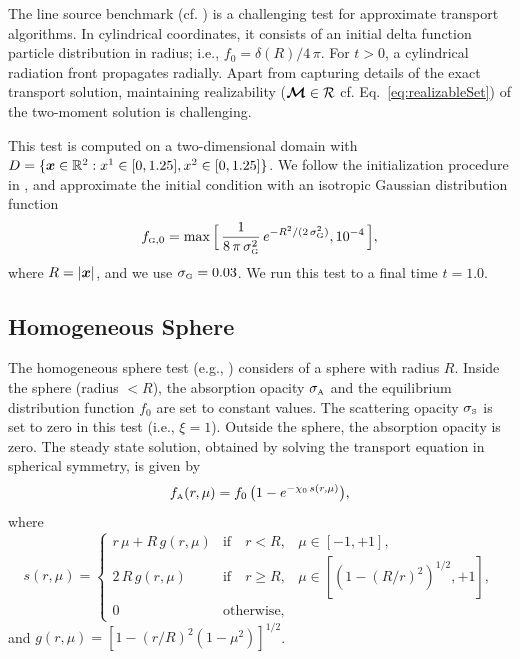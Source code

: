 The line source benchmark (cf. \cite{brunner_2002,garrettHauck_2013}) is a challenging test for approximate transport algorithms.  
In cylindrical coordinates, it consists of an initial delta function particle distribution in radius; i.e., $f_{0}=\delta(R)/4\,\pi$.  
For $t>0$, a cylindrical radiation front propagates radially.  
Apart from capturing details of the exact transport solution, maintaining realizability ($\boldsymbol{\mathcal{M}}\in\mathcal{R}$ cf. Eq.~\eqref{eq:realizableSet}) of the two-moment solution is challenging.  

This test is computed on a two-dimensional domain with $D=\{\boldsymbol{x}\in\mathbb{R}^{2}:x^{1}\in[0,1.25], x^{2}\in[0,1.25]\}$.  
We follow the initialization procedure in \cite{garrettHauck_2013}, and approximate the initial condition with an isotropic Gaussian distribution function
\begin{equation}
  f_{\mbox{\tiny G},0}
  =\max\Big[\,\frac{1}{8\,\pi\,\sigma_{\mbox{\tiny G}}^{2}}\,e^{-R^{2}/(2\,\sigma_{\mbox{\tiny G}}^{2})},10^{-4}\,\Big],
\end{equation}
where $R=|\boldsymbol{x}|$, and we use $\sigma_{\mbox{\tiny G}}=0.03$.  
We run this test to a final time $t=1.0$.  

\subsection{Homogeneous Sphere}

The homogeneous sphere test (e.g., \cite{smit_etal_1997}) considers of a sphere with radius $R$.  
Inside the sphere (radius $<R$), the absorption opacity $\sigma_{\mbox{\tiny A}}$ and the equilibrium distribution function $f_{0}$ are set to constant values.  
The scattering opacity $\sigma_{\mbox{\tiny S}}$ is set to zero in this test (i.e., $\xi=1$).  
Outside the sphere, the absorption opacity is zero.  
The steady state solution, obtained by solving the transport equation in spherical symmetry, is given by
\begin{equation}
  f_{\mbox{\tiny A}}(r,\mu)=f_{0}\,\big(1-e^{-\chi_{0}\,s(r,\mu)}\big),
  \label{eq:distributionHomogeneousSphere}
\end{equation}
where
\begin{equation}
  s(r,\mu)
  =\left\{
  \begin{array}{lll}
    r\,\mu+R\,g(r,\mu) & \mbox{if}\quad r<R, & \mu\in[-1,+1], \\
    2\,R\,g(r,\mu) & \mbox{if}\quad r \ge R, & \mu\in[(1-(R/r)^{2})^{1/2},+1], \\
    0 & \mbox{otherwise},
  \end{array}
  \right.
\end{equation}
and $g(r,\mu)=[1-(r/R)^{2}(1-\mu^{2})]^{1/2}$.  

